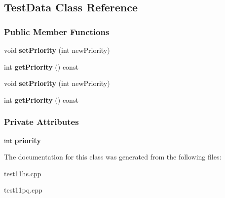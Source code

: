 \hypertarget{class_test_data}{}\subsection{Test\+Data Class Reference}
\label{class_test_data}
\subsubsection*{Public Member Functions}
\begin{DoxyCompactItemize}
\item 
void {\bfseries set\+Priority} (int new\+Priority)\hypertarget{class_test_data_af6c76355a3ab75cd07ca6bba7dfe2115}{}\label{class_test_data_af6c76355a3ab75cd07ca6bba7dfe2115}

\item 
int {\bfseries get\+Priority} () const \hypertarget{class_test_data_a11f3f060f167d1989c94bf94860aed20}{}\label{class_test_data_a11f3f060f167d1989c94bf94860aed20}

\item 
void {\bfseries set\+Priority} (int new\+Priority)\hypertarget{class_test_data_af6c76355a3ab75cd07ca6bba7dfe2115}{}\label{class_test_data_af6c76355a3ab75cd07ca6bba7dfe2115}

\item 
int {\bfseries get\+Priority} () const \hypertarget{class_test_data_a11f3f060f167d1989c94bf94860aed20}{}\label{class_test_data_a11f3f060f167d1989c94bf94860aed20}

\end{DoxyCompactItemize}
\subsubsection*{Private Attributes}
\begin{DoxyCompactItemize}
\item 
int {\bfseries priority}\hypertarget{class_test_data_a2aa3dc886a21401ecc0e6ee3c40d7342}{}\label{class_test_data_a2aa3dc886a21401ecc0e6ee3c40d7342}

\end{DoxyCompactItemize}


The documentation for this class was generated from the following files\+:\begin{DoxyCompactItemize}
\item 
test11hs.\+cpp\item 
test11pq.\+cpp\end{DoxyCompactItemize}
